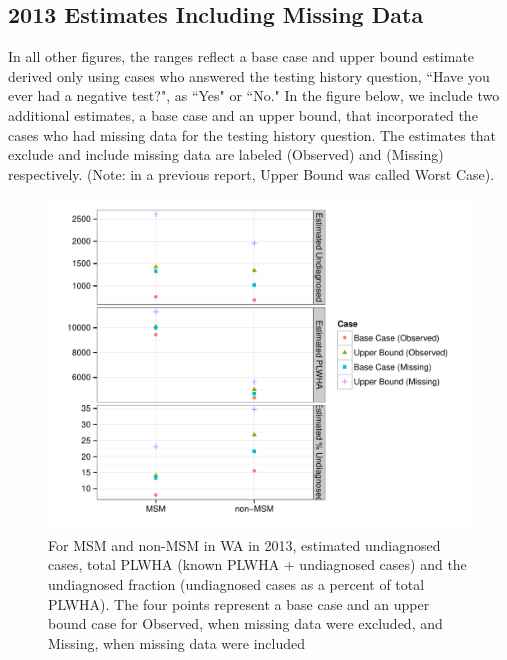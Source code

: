 \documentclass{article}\usepackage[]{graphicx}\usepackage[]{color}
\makeatletter
\def\maxwidth{ %
  \ifdim\Gin@nat@width>\linewidth
    \linewidth
  \else
    \Gin@nat@width
  \fi
}
\newenvironment{knitrout}{}{} %
\makeatother
\begin{document}
\subsection{2013 Estimates Including Missing Data}
In all other figures, the ranges reflect a base case and upper bound estimate derived only using cases who answered the testing history question, ``Have you ever had a negative test?", as ``Yes" or ``No." In the figure below, we include two additional estimates, a base case and an upper bound, that incorporated the cases who had missing data for the testing history question. The estimates that exclude and include missing data are labeled (Observed) and (Missing) respectively. (Note: in a previous report, Upper Bound was called Worst Case). 
\begin{knitrout}\footnotesize
{}\color{fgcolor}\begin{figure}[h]


{\centering \includegraphics[width=\maxwidth]{figure/minimal-WA-MSM-allcases} 

}

\caption[For MSM and non-MSM in WA in 2013, estimated undiagnosed cases, total PLWHA (known PLWHA + undiagnosed cases) and the undiagnosed fraction (undiagnosed cases as a percent of total PLWHA)]{For MSM and non-MSM in WA in 2013, estimated undiagnosed cases, total PLWHA (known PLWHA + undiagnosed cases) and the undiagnosed fraction (undiagnosed cases as a percent of total PLWHA). The four points represent a base case and an upper bound case for Observed, when missing data were excluded, and Missing, when missing data were included\label{fig:WA-MSM-allcases}}
\end{figure}


\end{knitrout}
\end{document}
